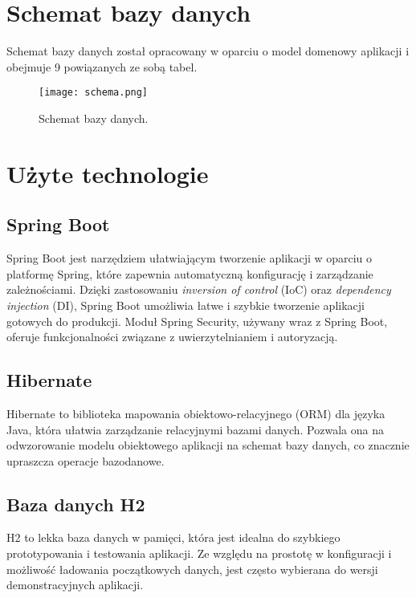 \documentclass[shortabstract]{iithesis}
\begin{document}
\newpage

\section{Schemat bazy danych}
\label{schema}
Schemat bazy danych został opracowany w oparciu o model domenowy aplikacji i obejmuje 9 powiązanych ze sobą tabel.

\begin{figure}[H]
    \centering
    \texttt{[image: schema.png]}
    \caption{Schemat bazy danych.}
    \label{fig:chema}
\end{figure}

\section{Użyte technologie}

\subsection{Spring Boot}
Spring Boot jest narzędziem ułatwiającym tworzenie aplikacji w oparciu o platformę Spring, które zapewnia automatyczną konfigurację i zarządzanie zależnościami. Dzięki zastosowaniu \textit{inversion of control} (IoC) oraz \textit{dependency injection} (DI), Spring Boot umożliwia łatwe i szybkie tworzenie aplikacji gotowych do produkcji. Moduł Spring Security, używany wraz z Spring Boot, oferuje funkcjonalności związane z uwierzytelnianiem i autoryzacją\cite{springboot}.

\subsection{Hibernate}
Hibernate to biblioteka mapowania obiektowo-relacyjnego (ORM) dla języka Java, która ułatwia zarządzanie relacyjnymi bazami danych. Pozwala ona na odwzorowanie modelu obiektowego aplikacji na schemat bazy danych, co znacznie upraszcza operacje bazodanowe\cite{hibernate}.

\subsection{Baza danych H2}
H2 to lekka baza danych w pamięci, która jest idealna do szybkiego prototypowania i testowania aplikacji. Ze względu na prostotę w konfiguracji i możliwość ładowania początkowych danych, jest często wybierana do wersji demonstracyjnych aplikacji\cite{h2database}.
\end{document}
